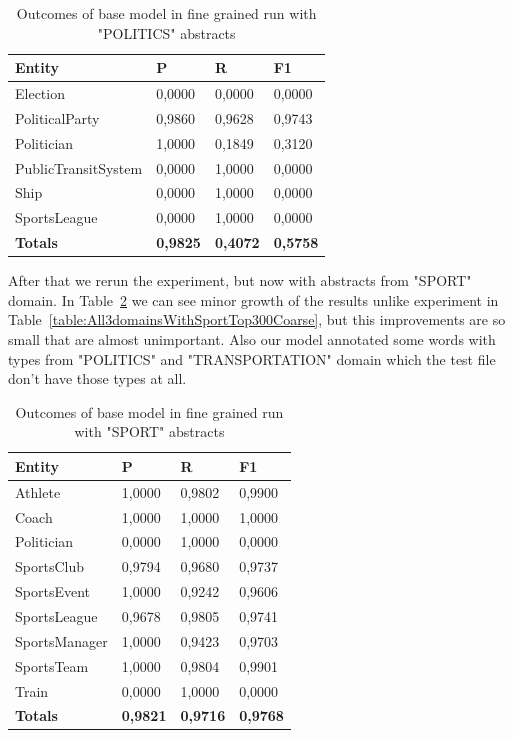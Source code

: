 \documentclass[thesis=M,english]{FITthesis}[2018/05/30]
\begin{document}
	\begin{table}[H]\centering
		\begin{tabular}{|l|l|l|l|}
			\hline {\textbf{Entity}} & {\textbf{P}} & {\textbf{R}} & {\textbf{F1}}\\\hline
				Election & 0,0000 & 0,0000 & 0,0000\\
				PoliticalParty & 0,9860 & 0,9628 & 0,9743\\
				Politician & 1,0000 & 0,1849 & 0,3120\\
				PublicTransitSystem & 0,0000 & 1,0000 & 0,0000\\
				Ship & 0,0000 & 1,0000 & 0,0000\\
				SportsLeague & 0,0000 & 1,0000 & 0,0000\\\hline
				\textbf{Totals} & \textbf{0,9825} & \textbf{0,4072} & \textbf{0,5758}\\\hline
		\end{tabular}
		\caption{Outcomes of base model in fine grained run with "POLITICS" abstracts\label{table:All3domainsWithPoliticsTop300Fine}}
	\end{table}	

    After that we rerun the experiment, but now with abstracts from "SPORT" domain. In Table~\ref{table:All3domainsWithSportTop300Fine} we can see minor growth of the results unlike experiment in Table~\ref{table:All3domainsWithSportTop300Coarse}, but this improvements are so small that are almost unimportant. Also our model annotated some words with types from "POLITICS" and "TRANSPORTATION" domain which the test file don't have those types at all.
    
	\begin{table}[H]\centering
		\begin{tabular}{|l|l|l|l|}
			\hline {\textbf{Entity}} & {\textbf{P}} & {\textbf{R}} & {\textbf{F1}}\\\hline
				Athlete & 1,0000 & 0,9802 & 0,9900\\
				Coach & 1,0000 & 1,0000 & 1,0000\\
				Politician & 0,0000 & 1,0000 & 0,0000\\
				SportsClub & 0,9794 & 0,9680 & 0,9737\\
				SportsEvent & 1,0000 & 0,9242 & 0,9606\\
				SportsLeague & 0,9678 & 0,9805 & 0,9741\\
				SportsManager & 1,0000 & 0,9423 & 0,9703\\				
				SportsTeam & 1,0000 & 0,9804 & 0,9901\\
				Train & 0,0000 & 1,0000 & 0,0000\\\hline
				\textbf{Totals} & \textbf{0,9821} & \textbf{0,9716} & \textbf{0,9768}\\\hline
		\end{tabular}
		\caption{Outcomes of base model in fine grained run with "SPORT" abstracts \label{table:All3domainsWithSportTop300Fine}}
	\end{table}
	
\end{document}
